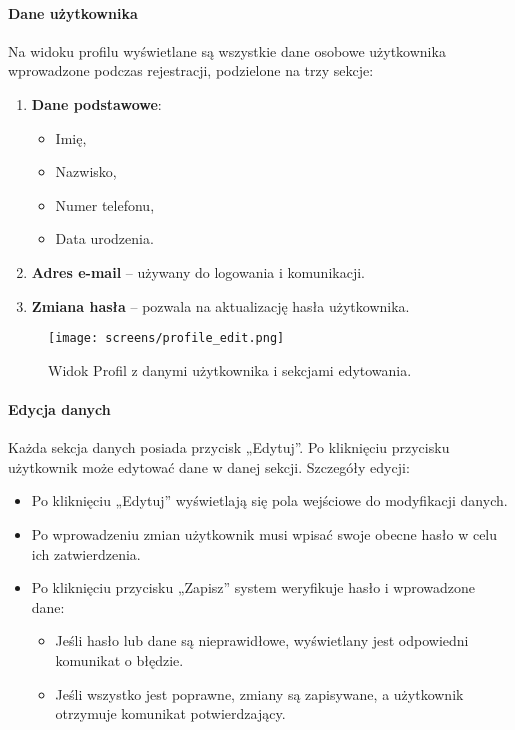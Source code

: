 \documentclass[12pt,a4paper,oneside]{article}
\theoremstyle{definition}
\numberwithin{equation}{section}
\begin{document}
\paragraph{Dane użytkownika}
Na widoku profilu wyświetlane są wszystkie dane osobowe użytkownika wprowadzone podczas rejestracji, podzielone na trzy sekcje:
\begin{enumerate}
    \item \textbf{Dane podstawowe}:
    \begin{itemize}
        \item Imię,
        \item Nazwisko,
        \item Numer telefonu,
        \item Data urodzenia.
    \end{itemize}
    \item \textbf{Adres e-mail} – używany do logowania i komunikacji.
    \item \textbf{Zmiana hasła} – pozwala na aktualizację hasła użytkownika.
\end{enumerate}

\begin{figure}[h!]
    \centering
    \texttt{[image: screens/profile\_edit.png]}
    \caption{Widok Profil z danymi użytkownika i sekcjami edytowania.}
    \label{fig:profile_edit}
\end{figure}

\paragraph{Edycja danych}
Każda sekcja danych posiada przycisk „Edytuj”. Po kliknięciu przycisku użytkownik może edytować dane w danej sekcji. Szczegóły edycji:
\begin{itemize}
    \item Po kliknięciu „Edytuj” wyświetlają się pola wejściowe do modyfikacji danych.
    \item Po wprowadzeniu zmian użytkownik musi wpisać swoje obecne hasło w celu ich zatwierdzenia.
    \item Po kliknięciu przycisku „Zapisz” system weryfikuje hasło i wprowadzone dane:
    \begin{itemize}
        \item Jeśli hasło lub dane są nieprawidłowe, wyświetlany jest odpowiedni komunikat o błędzie.
        \item Jeśli wszystko jest poprawne, zmiany są zapisywane, a użytkownik otrzymuje komunikat potwierdzający.
    \end{itemize}
\end{itemize}
\end{document}
